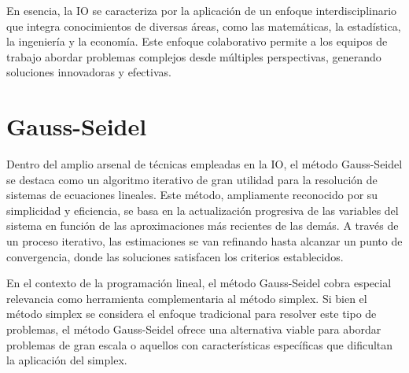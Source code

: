 \documentclass[conference]{IEEEtran}
\begin{document}
En esencia, la IO se caracteriza por la aplicación de un enfoque 
interdisciplinario que integra conocimientos de diversas áreas, como 
las matemáticas, la estadística, la ingeniería y la economía. Este 
enfoque colaborativo permite a los equipos de trabajo abordar problemas 
complejos desde múltiples perspectivas, generando soluciones innovadoras 
y efectivas.

\section{Gauss-Seidel}

Dentro del amplio arsenal de técnicas empleadas en la IO, el método 
Gauss-Seidel se destaca como un algoritmo iterativo de gran utilidad para 
la resolución de sistemas de ecuaciones lineales. Este método, ampliamente 
reconocido por su simplicidad y eficiencia, se basa en la actualización 
progresiva de las variables del sistema en función de las aproximaciones 
más recientes de las demás. A través de un proceso iterativo, las 
estimaciones se van refinando hasta alcanzar un punto de convergencia, donde 
las soluciones satisfacen los criterios establecidos.

En el contexto de la programación lineal, el método Gauss-Seidel cobra 
especial relevancia como herramienta complementaria al método simplex. Si 
bien el método simplex se considera el enfoque tradicional para resolver 
este tipo de problemas, el método Gauss-Seidel ofrece una alternativa viable 
para abordar problemas de gran escala o aquellos con características 
específicas que dificultan la aplicación del simplex.


\end{document}
